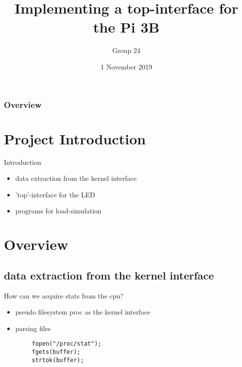 \documentclass{beamer}
\title[pi-Sensehat]{Implementing a top-interface for the Pi 3B} %
\author{Group 24} %
\institute[Introduction to Embedded Systems 2019] %
{
Introduction to Embedded Systems\\ %
\medskip
}
\date{1 November 2019} %
\begin{document}
\begin{frame}
\titlepage %
\end{frame}

\begin{frame}
\frametitle{Overview} %
\tableofcontents %
\end{frame}



\section{Project Introduction}
\begin{frame}{Introduction}
    \begin{itemize}
				\item data extraction from the kernel interface
        \item 'top'-interface for the LED
        \item programs for load-simulation
    \end{itemize}
\end{frame}
\section{Overview}
\subsection{data extraction from the kernel interface}
\begin{frame}[fragile]{How can we acquire stats from the cpu?}
	\begin{itemize}
		\item pseudo filesystem proc as the kernel interface
		\item parsing files
	\end{itemize}

	\begin{lstlisting}
		fopen("/proc/stat");
		fgets(buffer);
		strtok(buffer);
	\end{lstlisting}
\end{frame}
\end{document}
